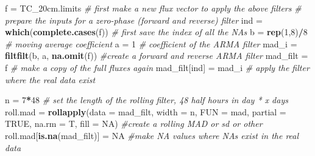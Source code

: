 \documentclass[
]{article}
\newenvironment{Shaded}{\begin{snugshade}}{\end{snugshade}}
\newcommand{\AttributeTok}[1]{\textcolor[rgb]{0.13,0.29,0.53}{#1}}
\newcommand{\CommentTok}[1]{\textcolor[rgb]{0.56,0.35,0.01}{\textit{#1}}}
\newcommand{\ConstantTok}[1]{\textcolor[rgb]{0.56,0.35,0.01}{#1}}
\newcommand{\DecValTok}[1]{\textcolor[rgb]{0.00,0.00,0.81}{#1}}
\newcommand{\FunctionTok}[1]{\textcolor[rgb]{0.13,0.29,0.53}{\textbf{#1}}}
\newcommand{\NormalTok}[1]{#1}
\newcommand{\OtherTok}[1]{\textcolor[rgb]{0.56,0.35,0.01}{#1}}
\newcommand{\SpecialCharTok}[1]{\textcolor[rgb]{0.81,0.36,0.00}{\textbf{#1}}}
\begin{document}
\begin{Shaded}
\begin{Highlighting}[]
\NormalTok{f }\OtherTok{=}\NormalTok{ TC\_20cm.limits }\CommentTok{\# first make a new flux vector to apply the above filters}
\CommentTok{\# prepare the inputs for a zero{-}phase (forward and reverse) filter  }
\NormalTok{ind       }\OtherTok{=} \FunctionTok{which}\NormalTok{(}\FunctionTok{complete.cases}\NormalTok{(f))   }\CommentTok{\# first save the index of all the NAs}
\NormalTok{b         }\OtherTok{=} \FunctionTok{rep}\NormalTok{(}\DecValTok{1}\NormalTok{,}\DecValTok{8}\NormalTok{)}\SpecialCharTok{/}\DecValTok{8}                 \CommentTok{\# moving average coefficient}
\NormalTok{a         }\OtherTok{=} \DecValTok{1}                          \CommentTok{\# coefficient of the ARMA filter}
\NormalTok{mad\_i    }\OtherTok{=} \FunctionTok{filtfilt}\NormalTok{(b, a, }\FunctionTok{na.omit}\NormalTok{(f)) }\CommentTok{\#create a forward and reverse ARMA filter}
\NormalTok{mad\_filt }\OtherTok{=}\NormalTok{ f                          }\CommentTok{\# make a copy of the full fluxes again}
\NormalTok{mad\_filt[ind] }\OtherTok{=}\NormalTok{ mad\_i                }\CommentTok{\# apply the filter where the real data exist}

\NormalTok{n }\OtherTok{=} \DecValTok{7}\SpecialCharTok{*}\DecValTok{48} \CommentTok{\# set the length of the rolling filter, 48 half hours in day * x days}
\NormalTok{roll.mad }\OtherTok{=} \FunctionTok{rollapply}\NormalTok{(}\AttributeTok{data =}\NormalTok{ mad\_filt,}
                     \AttributeTok{width =}\NormalTok{ n,}
                     \AttributeTok{FUN =}\NormalTok{ mad,}
                     \AttributeTok{partial =} \ConstantTok{TRUE}\NormalTok{,}
                     \AttributeTok{na.rm =}\NormalTok{ T,}
                     \AttributeTok{fill =} \ConstantTok{NA}\NormalTok{)  }\CommentTok{\#create a rolling MAD or sd or other}
\NormalTok{roll.mad[}\FunctionTok{is.na}\NormalTok{(mad\_filt)] }\OtherTok{=} \ConstantTok{NA}  \CommentTok{\#make NA values where NAs exist in the real data}


\end{Highlighting}
\end{Shaded}
\end{document}
